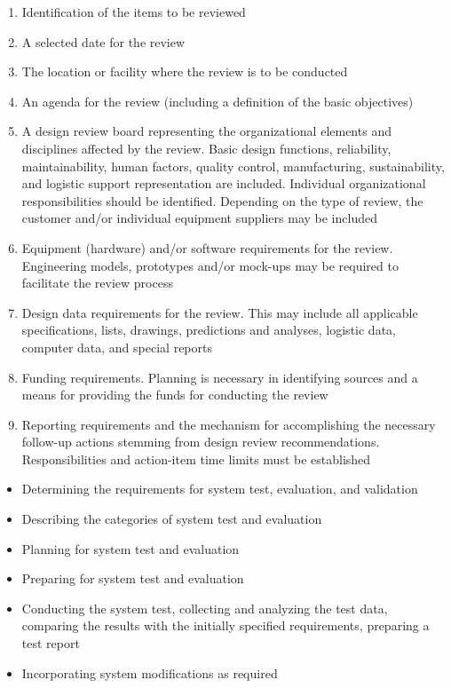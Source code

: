 \begin{enumerate}
	\item Identification of the items to be reviewed
	\item A selected date for the review
	\item The location or facility where the review is to be conducted
	\item An agenda for the review (including a definition of the basic objectives)
	\item A design review board representing the organizational elements and disciplines affected by the review. Basic design functions, reliability, maintainability, human factors, quality control, manufacturing, sustainability, and logistic support representation are included. Individual organizational responsibilities should be identified. Depending on the type of review, the customer and/or individual equipment suppliers may be included
	\item Equipment (hardware) and/or software requirements for the review. Engineering models, prototypes and/or mock-ups may be required to facilitate the review process
	\item Design data requirements for the review. This may include all applicable specifications, lists, drawings, predictions and analyses, logistic data, computer data, and special reports
	\item Funding requirements. Planning is necessary in identifying sources and a means for providing the funds for conducting the review
	\item Reporting requirements and the mechanism for accomplishing the necessary follow-up actions stemming from design review recommendations. Responsibilities and action-item time limits must be established
\end{enumerate}

\begin{itemize}
	\item Determining the requirements for system test, evaluation, and validation
	\item Describing the categories of system test and evaluation
	\item Planning for system test and evaluation
	\item Preparing for system test and evaluation
	\item Conducting the system test, collecting and analyzing the test data, comparing the results with the initially specified requirements, preparing a test report
	\item Incorporating system modifications as required
\end{itemize}

